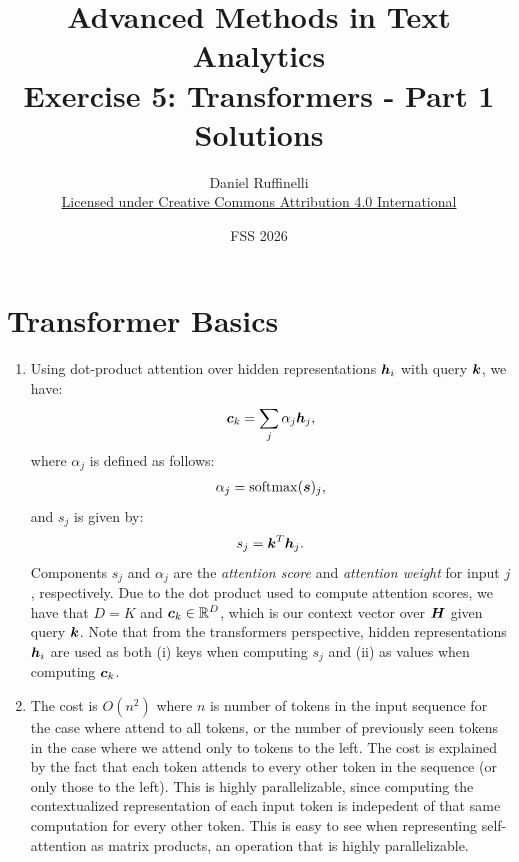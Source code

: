 \documentclass[11pt,a4paper]{article}
\title{Advanced Methods in Text Analytics \\ 
Exercise 5: Transformers - Part 1\\
\textbf{Solutions}}
\author{Daniel Ruffinelli \\ \href{https://creativecommons.org/licenses/by/4.0/}{Licensed under Creative Commons Attribution 4.0 International}}
\date{FSS 2026}
\begin{document}
\maketitle

\section{Transformer Basics}

\begin{enumerate}[label=(\alph*)]
    \item Using dot-product attention over hidden representations ${\boldsymbol{h}}_i$ with
          query ${\boldsymbol{k}}$, we have:
          \begin{align*}
              {\boldsymbol{c}}_k = \sum_j \alpha_j{\boldsymbol{h}}_j,
          \end{align*}
          where $\alpha_j$ is defined as follows:
          \begin{align*}
              \alpha_j = \operatorname{softmax}({\boldsymbol{s}})_j,
          \end{align*}
          and $s_j$ is given by:
          \begin{align*}
              s_j = {\boldsymbol{k}}^T{\boldsymbol{h}}_j.
          \end{align*}
          Components $s_j$ and $\alpha_j$ are the \emph{attention score} and
          \emph{attention weight} for input $j$, respectively.
          Due to the dot product used to compute attention scores, we have that
          $D = K$ and ${\boldsymbol{c}}_k\in\mathbb{R}^D$, which is our context vector over ${\boldsymbol{H}}$
          given query ${\boldsymbol{k}}$.
          Note that from the transformers perspective, hidden representations
          ${\boldsymbol{h}}_i$ are used as both (i) keys when computing $s_j$ and (ii) as
          values when computing ${\boldsymbol{c}}_k$.
    \item The cost is $O(n^2)$ where $n$ is number of tokens in the input
          sequence for the case where attend to all tokens, or the number of
          previously seen tokens in the case where we attend only to tokens to
          the left.
          The cost is explained by the fact that each token attends to every
          other token in the sequence (or only those to the left).
          This is highly parallelizable, since computing the contextualized
          representation of each input token is indepedent of that same
          computation for every other token.
          This is easy to see when representing self-attention as matrix
          products, an operation that is highly parallelizable.


\end{enumerate}
\end{document}

